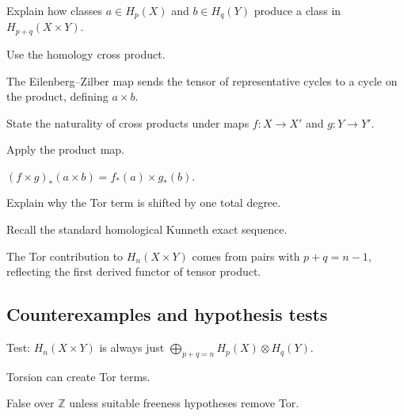 \begin{exercise}\label{exr:viii27-ped-07}
Explain how classes $a\in H_p(X)$ and $b\in H_q(Y)$ produce a class in $H_{p+q}(X\times Y)$.
\end{exercise}
\begin{hint}
Use the homology cross product.
\end{hint}
\begin{solution}
The Eilenberg--Zilber map sends the tensor of representative cycles to a cycle on the product, defining $a\times b$.
\end{solution}

\begin{exercise}[Naturality]\label{exr:viii27-ped-08}
State the naturality of cross products under maps $f:X\to X'$ and $g:Y\to Y'$.
\end{exercise}
\begin{hint}
Apply the product map.
\end{hint}
\begin{solution}
$(f\times g)_*(a\times b)=f_*(a)\times g_*(b)$.
\end{solution}

\begin{exercise}\label{exr:viii27-ped-09}
Explain why the Tor term is shifted by one total degree.
\end{exercise}
\begin{hint}
Recall the standard homological Kunneth exact sequence.
\end{hint}
\begin{solution}
The Tor contribution to $H_n(X\times Y)$ comes from pairs with $p+q=n-1$, reflecting the first derived functor of tensor product.
\end{solution}

\subsection*{Counterexamples and hypothesis tests}

\begin{exercise}\label{exr:viii27-ped-10}
Test: $H_n(X\times Y)$ is always just $\bigoplus_{p+q=n}H_p(X)\otimes H_q(Y)$.
\end{exercise}
\begin{hint}
Torsion can create Tor terms.
\end{hint}
\begin{solution}
False over $\mathbb Z$ unless suitable freeness hypotheses remove Tor.
\end{solution}

